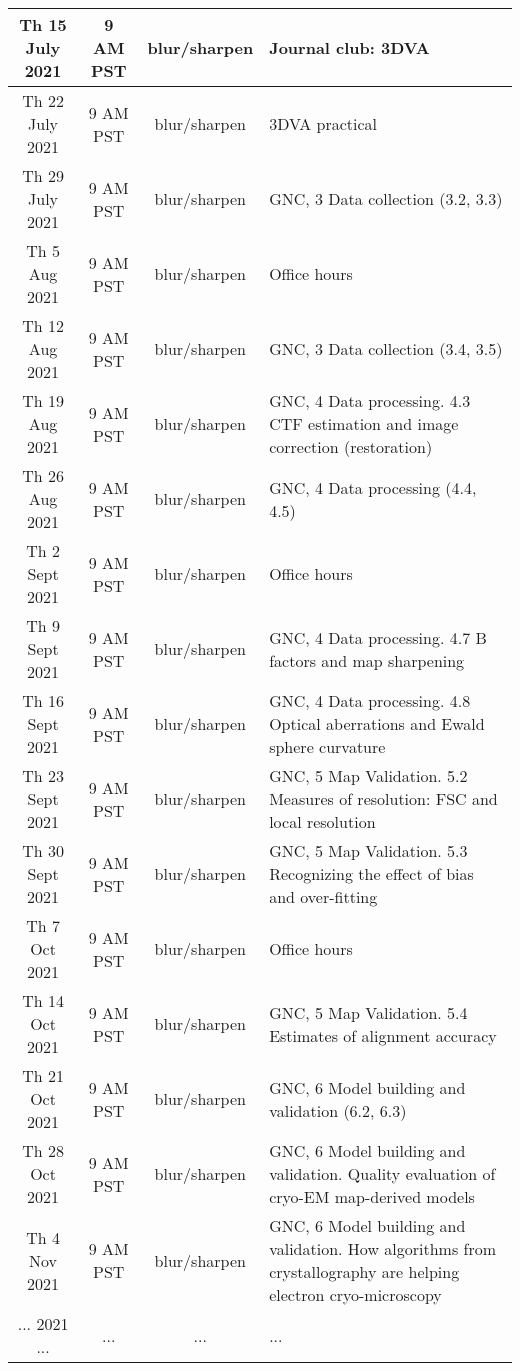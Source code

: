 \documentclass[11pt, oneside]{article}   	%
\begin{document}
\begin{center}
\begin{tabular}{|| c c c p{90mm} ||}
 \hline
Th 15 July 2021 & \tiny{9 AM PST} & blur/sharpen & Journal club: 3DVA \\
 \hline
Th 22 July 2021 & \tiny{9 AM PST} & blur/sharpen & 3DVA practical \\
 \hline
Th 29 July 2021 & \tiny{9 AM PST} & blur/sharpen & GNC, 3 Data collection (3.2, 3.3) \\
 \hline
Th 5 Aug 2021& \tiny{9 AM PST} & blur/sharpen & Office hours  \\ 
 \hline
Th 12 Aug 2021& \tiny{9 AM PST} & blur/sharpen & GNC, 3 Data collection (3.4, 3.5)  \\ 
 \hline
Th 19 Aug 2021& \tiny{9 AM PST} & blur/sharpen & \tiny{GNC, 4 Data processing. 4.3 CTF estimation and image correction (restoration)} \\
 \hline
Th 26 Aug 2021& \tiny{9 AM PST} & blur/sharpen &  GNC, 4 Data processing (4.4, 4.5) \\ 
 \hline
Th 2 Sept 2021& \tiny{9 AM PST} & blur/sharpen & Office hours  \\ 
 \hline
Th 9 Sept 2021& \tiny{9 AM PST} & blur/sharpen & \tiny{GNC, 4 Data processing. 4.7 B factors and map sharpening}  \\
 \hline
Th 16 Sept 2021& \tiny{9 AM PST} & blur/sharpen & \tiny{GNC, 4 Data processing. 4.8 Optical aberrations and Ewald sphere curvature}  \\ 
 \hline
Th 23 Sept 2021& \tiny{9 AM PST} & blur/sharpen & \tiny{GNC, 5 Map Validation. 5.2 Measures of resolution: FSC and local resolution}  \\ 
 \hline
Th 30 Sept 2021& \tiny{9 AM PST} & blur/sharpen & \tiny{GNC, 5 Map Validation. 5.3 Recognizing the effect of bias and over-fitting}  \\ 
 \hline
Th 7 Oct 2021& \tiny{9 AM PST} & blur/sharpen & Office hours  \\ 
 \hline
Th 14 Oct 2021 & \tiny{9 AM PST} & blur/sharpen &\tiny{GNC, 5 Map Validation. 5.4 Estimates of alignment accuracy}  \\
 \hline
Th 21 Oct 2021& \tiny{9 AM PST} & blur/sharpen & GNC, 6 Model building and validation (6.2, 6.3)  \\ 
 \hline
Th 28 Oct 2021 & \tiny{9 AM PST} & blur/sharpen &\tiny{GNC, 6 Model building and validation. \newline 6.4 Quality evaluation of cryo-EM map-derived models}\\ 
 \hline
Th 4 Nov 2021& \tiny{9 AM PST} & blur/sharpen &\tiny{GNC, 6 Model building and validation. \newline 6.5 How algorithms from crystallography are helping electron cryo-microscopy} \\ [1ex] 
 \hline
 ... 2021 ... & ... &  ... & ...  \\ 
 \hline
\end{tabular}
\end{center}
\end{document}
